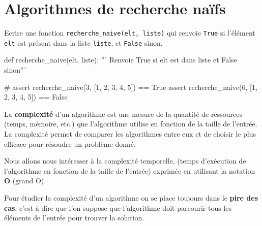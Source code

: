 \def\level{Première}  %
\def\course{NSI}
\def\chaptername{Algorithmes de recherche} %
\def\docname{AP06}        %

\pagestyle{cours_FP}
\makeheader{} %

\section{Algorithmes de recherche naïfs}


\begin{exercice_cours}{}
	Ecrire une fonction \texttt{recherche\_naive(elt, liste)} qui renvoie \texttt{True} si l'élément \texttt{elt} est présent dans la liste \texttt{liste}, et \texttt{False} sinon.
	\begin{CodePythontexAlt}[Largeur=1\linewidth,Centre,PremLigne=1, Lignes=false]{}		
def recherche_naive(elt, liste):
	''' Renvoie True si elt est dans liste et False sinon'''









	#
assert recherche_naive(3, [1, 2, 3, 4, 5]) == True
assert recherche_naive(6, [1, 2, 3, 4, 5]) == False
		\end{CodePythontexAlt}
\end{exercice_cours}


\begin{definition}{}
	La \textbf{complexité} d'un algorithme est une mesure de la quantité de ressources (temps, mémoire, etc.) que l'algorithme utilise en fonction de la taille de l'entrée. La complexité permet de comparer les algorithmes entre eux et de choisir le plus efficace pour résoudre un problème donné.	

	Nous allons nous intéresser à la complexité temporelle, (temps d'exécution de l'algorithme en fonction de la taille de l'entrée) exprimée en utilisant la notation \textbf{O} (grand O).
	
	Pour étudier la complexité d'un algorithme on se place toujours dans le \textbf{pire des cas}, c'est à dire que l'on suppose que l'algorithme doit parcourir tous les éléments de l'entrée pour trouver la solution.
\end{definition}

